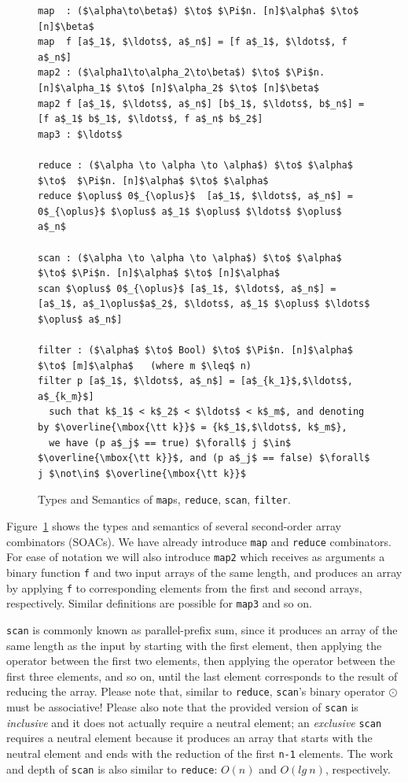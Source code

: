 \documentclass[acmsmall,review]{acmart}\settopmatter{printfolios=true,printccs=false,printacmref=false}
\begin{document}
\begin{figure}
\begin{lstlisting}[mathescape=true]
map  : ($\alpha\to\beta$) $\to$ $\Pi$n. [n]$\alpha$ $\to$ [n]$\beta$
map  f [a$_1$, $\ldots$, a$_n$] = [f a$_1$, $\ldots$, f a$_n$]
map2 : ($\alpha1\to\alpha_2\to\beta$) $\to$ $\Pi$n. [n]$\alpha_1$ $\to$ [n]$\alpha_2$ $\to$ [n]$\beta$
map2 f [a$_1$, $\ldots$, a$_n$] [b$_1$, $\ldots$, b$_n$] = [f a$_1$ b$_1$, $\ldots$, f a$_n$ b$_2$]
map3 : $\ldots$

reduce : ($\alpha \to \alpha \to \alpha$) $\to$ $\alpha$ $\to$  $\Pi$n. [n]$\alpha$ $\to$ $\alpha$
reduce $\oplus$ 0$_{\oplus}$  [a$_1$, $\ldots$, a$_n$] = 0$_{\oplus}$ $\oplus$ a$_1$ $\oplus$ $\ldots$ $\oplus$ a$_n$

scan : ($\alpha \to \alpha \to \alpha$) $\to$ $\alpha$ $\to$ $\Pi$n. [n]$\alpha$ $\to$ [n]$\alpha$
scan $\oplus$ 0$_{\oplus}$ [a$_1$, $\ldots$, a$_n$] = [a$_1$, a$_1\oplus$a$_2$, $\ldots$, a$_1$ $\oplus$ $\ldots$ $\oplus$ a$_n$]

filter : ($\alpha$ $\to$ Bool) $\to$ $\Pi$n. [n]$\alpha$ $\to$ [m]$\alpha$   (where m $\leq$ n)
filter p [a$_1$, $\ldots$, a$_n$] = [a$_{k_1}$,$\ldots$, a$_{k_m}$]
  such that k$_1$ < k$_2$ < $\ldots$ < k$_m$, and denoting by $\overline{\mbox{\tt k}}$ = {k$_1$,$\ldots$, k$_m$},
  we have (p a$_j$ == true) $\forall$ j $\in$ $\overline{\mbox{\tt k}}$, and (p a$_j$ == false) $\forall$ j $\not\in$ $\overline{\mbox{\tt k}}$
\end{lstlisting}\vspace{-4ex}
\caption{Types and Semantics of \lstinline{map}s, \lstinline{reduce}, \lstinline{scan}, \lstinline{filter}.}
\label{fig:futhark-par-ops}
\end{figure}

Figure~\ref{fig:futhark-par-ops} shows the types and semantics of several second-order
array combinators (SOACs). We have already introduce \lstinline{map} and 
\lstinline{reduce} combinators. For ease of notation we will also introduce
\lstinline{map2} which receives as arguments a binary function {\tt f} and 
two input arrays of the same length, and produces an array by applying {\tt f}
to corresponding elements from the first and second arrays, respectively. 
Similar definitions are possible for {\tt map3} and so on.

\lstinline{scan} is commonly known as parallel-prefix sum, since it produces
an array of the same length as the input by starting with the first element,
then applying the operator between the first two elements, then applying the
operator between the first three elements, and so on, until the last element
corresponds to the result of reducing the array. Please note that, similar to
\lstinline{reduce}, \lstinline{scan}'s binary operator $\odot$ must be associative!
Please also note that the provided version of \lstinline{scan} is \emph{inclusive}
and it does not actually require a neutral element; an \emph{exclusive}
\lstinline{scan} requires a neutral element because it produces an array 
that starts with the neutral element and ends with the reduction of the 
first {\tt n-1} elements. The work and depth
of \lstinline{scan} is also similar to \lstinline{reduce}: $O(n)$ and $O(lg~n)$,
respectively.
\end{document}
